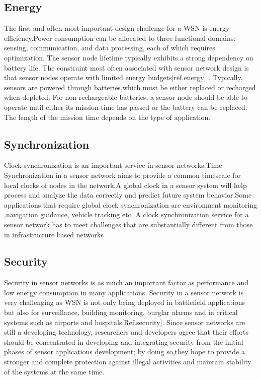 	\subsection{Energy}
	The first and  often most important design challenge for a WSN is energy efficiency.Power consumption  can  be  allocated  to  three  functional  domains: sensing, communication, and data processing, each of which requires  optimization.  The  sensor  node  lifetime  typically exhibits a  strong dependency on battery life. The constraint most  often  associated  with  sensor  network  design  is  that sensor nodes operate with limited energy budgets[ref.energy] \cite{energy}.  
	\newline
	Typically,  sensors  are  powered  through  batteries,which  must  be  either  replaced  or  recharged  when  depleted. For non rechargeable batteries, a sensor node should be able to  operate  until  either  its  mission  time  has  passed  or  the battery  can  be  replaced.  The  length  of  the  mission  time depends on the type of application\cite{energy}. 
	
	
	\subsection{Synchronization}
	Clock  synchronization is an important  service  in  sensor networks.Time Synchronization in a sensor network aims to provide a common timescale for local clocks of nodes  in  the  network.A global clock in a sensor  system  will  help  process and analyze the data  correctly and predict future system behavior.Some applications that require global clock synchronization are environment monitoring ,navigation guidance, vehicle tracking etc. A clock synchronization service for a sensor network has to meet challenges that are substantially different from those in infrastructure based networks\cite{sync2} \cite{sync1}
	
	
	
	\subsection{Security}
	Security in sensor networks is as much an important factor as performance    and    low    energy    consumption    in    many applications. Security in a sensor network is very challenging as WSN is not only being deployed in battlefield applications but  also  for  surveillance,  building  monitoring,  burglar  alarms  and in critical systems such as airports and hospitals\cite{}[Ref.security].
	Since  sensor  networks  are  still  a  developing  technology, researchers  and  developers  agree  that  their  efforts  should  be concentrated  in  developing  and  integrating  security  from  the  initial phases of sensor applications development; by doing so,they hope to provide a stronger and complete protection against illegal  activities  and  maintain  stability  of  the  systems  at  the  same time\cite{}.
	
